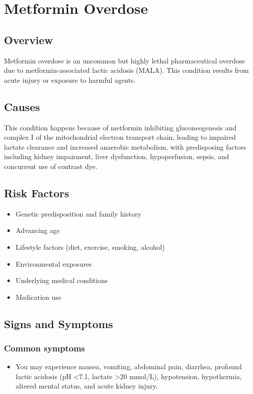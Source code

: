 \chapter{Metformin Overdose}
\label{sec:Metformin Overdose}

\section{Overview}
Metformin overdose is an uncommon but highly lethal pharmaceutical overdose due to metformin-associated lactic acidosis (MALA). This condition results from acute injury or exposure to harmful agents.
\section{Causes}
This condition happens because of metformin inhibiting gluconeogenesis and complex I of the mitochondrial electron transport chain, leading to impaired lactate clearance and increased anaerobic metabolism, with predisposing factors including kidney impairment, liver dysfunction, hypoperfusion, sepsis, and concurrent use of contrast dye.     
\section{Risk Factors}

\begin{itemize}[noitemsep]
  \item Genetic predisposition and family history
  \item Advancing age
  \item Lifestyle factors (diet, exercise, smoking, alcohol)
  \item Environmental exposures
  \item Underlying medical conditions
  \item Medication use
\end{itemize}
\section{Signs and Symptoms}

\subsection{Common symptoms}
\begin{itemize}[noitemsep]
  \item You may experience nausea, vomiting, abdominal pain, diarrhea, profound lactic acidosis (pH <7.1, lactate >20 mmol/L), hypotension, hypothermia, altered mental status, and acute kidney injury. 
  \end{itemize}

